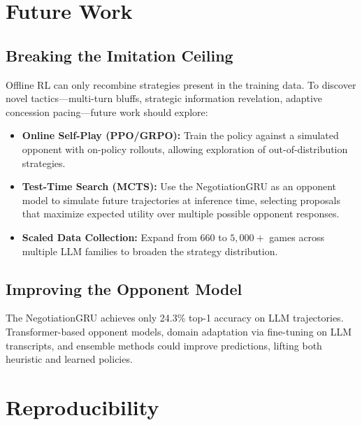 \documentclass[11pt,a4paper]{article}
\begin{document}
\section{Future Work}
\label{sec:future}

\subsection{Breaking the Imitation Ceiling}

Offline RL can only recombine strategies present in the training data. To discover novel tactics---multi-turn bluffs, strategic information revelation, adaptive concession pacing---future work should explore:

\begin{itemize}
\item \textbf{Online Self-Play (PPO/GRPO):} Train the policy against a simulated opponent with on-policy rollouts, allowing exploration of out-of-distribution strategies.
\item \textbf{Test-Time Search (MCTS):} Use the NegotiationGRU as an opponent model to simulate future trajectories at inference time, selecting proposals that maximize expected utility over multiple possible opponent responses.
\item \textbf{Scaled Data Collection:} Expand from 660 to $5{,}000+$ games across multiple LLM families to broaden the strategy distribution.
\end{itemize}

\subsection{Improving the Opponent Model}

The NegotiationGRU achieves only 24.3\% top-1 accuracy on LLM trajectories. Transformer-based opponent models, domain adaptation via fine-tuning on LLM transcripts, and ensemble methods could improve predictions, lifting both heuristic and learned policies.

\section{Reproducibility}
\label{sec:reproducibility}
\end{document}

